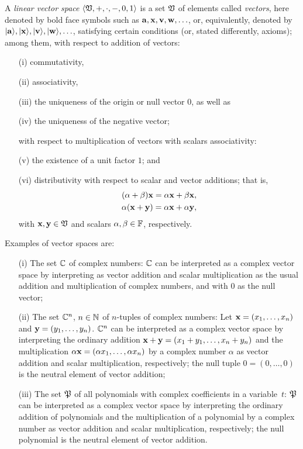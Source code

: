 A {\em linear vector space}      $\langle  \frak V , +, \cdot , -,  0, 1\rangle$
is a set $\frak V$ of elements called {\em vectors},
here denoted by  bold face  symbols such as
$
{\bf a},
{\bf x},
{\bf v},
{\bf w},
\ldots
$,
or, equivalently, denoted by
$
\vert {\bf a}\rangle,
\vert {\bf x}\rangle,
\vert {\bf v}\rangle,
\vert {\bf w}\rangle,
\ldots
$,
satisfying certain conditions (or, stated differently, axioms); among them,
with respect to addition of vectors:
\begin{itemize}
\item[(i)]
commutativity,
\item[(ii)]
associativity,
\item[(iii)]
the uniqueness of the origin or null vector $0$,
as well as
\item[(iv)]
the uniqueness of  the negative vector;
\item[ ]
with respect to multiplication of vectors with scalars associativity:
\item[(v)]
the existence of a unit factor $1$; and
\item[(vi)]
distributivity with respect to scalar and vector additions; that is,
\begin{equation}
\begin{split}
(\alpha +\beta ){\bf x} = \alpha {\bf x}+\beta  {\bf x}, \\
\alpha ({\bf x} +{\bf y}) = \alpha {\bf x}+\alpha {\bf y},
\end{split}
\end{equation}
with ${\bf x}, {\bf y} \in \frak V$ and scalars $\alpha ,\beta \in  {\Bbb F}$,
respectively.
\end{itemize}

{
\color{blue}
\bexample
Examples of vector spaces are:
\begin{itemize}
\item[(i)]
The set ${\Bbb C}$ of complex numbers: ${\Bbb C}$  can be interpreted as a complex vector space by  interpreting as vector addition and scalar multiplication
as the usual addition and multiplication of complex numbers, and with $0$ as the null vector;
\item[(ii)]
The set ${\Bbb C}^n$, $n \in {\Bbb N}$ of $n$-tuples of complex numbers:
Let
${\bf x}=
(x_1,\ldots , x_n)$
and
${\bf y}=
(y_1,\ldots , y_n)$.
 ${\Bbb C}^n$  can be interpreted as a complex vector space by  interpreting
the ordinary addition  $ {\bf x} + {\bf y} =  (x_1+y_1,\ldots , x_n+y_n)$
and the multiplication $\alpha {\bf x}=
(\alpha  x_1,\ldots ,\alpha  x_n)$ by a complex number $\alpha$ as vector addition
 and scalar multiplication, respectively;
the null tuple $0 =
(0,\ldots ,0)$ is the neutral element of vector addition;
\item[(iii)]
The set ${\frak P}$
 of all polynomials with complex coefficients in a variable~$t$:
${\frak P}$  can be interpreted as a complex vector space by  interpreting
the ordinary addition of polynomials and the multiplication of a polynomial by a complex number as vector addition and scalar multiplication,
respectively;
the null polynomial is the neutral element of vector addition.  \eexample
\end{itemize}
}


